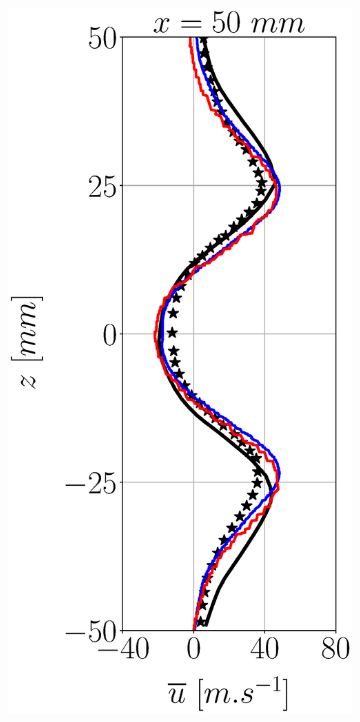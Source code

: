 \begin{figure}[h!]
\begin{subfigure}[b]{0.22\textwidth}
\end{subfigure}
\hfill
\begin{subfigure}[b]{0.22\textwidth}
	\centering
   \includegraphics[scale=0.25]{./part3_applications/figures_ch7_aero/BIMER_validation_quantitative_lines/x50_u_axial_mean.eps} 

\end{subfigure}
\end{figure}
